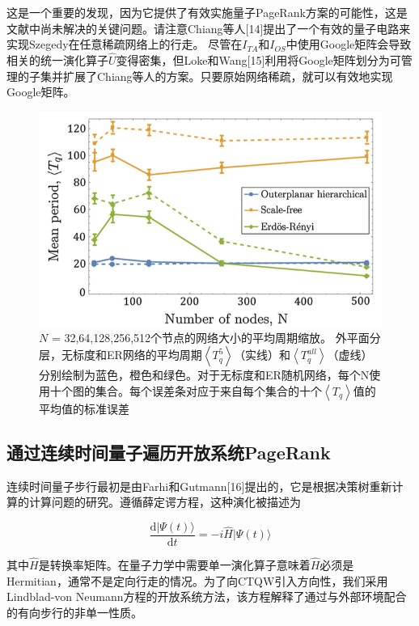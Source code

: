 这是一个重要的发现，因为它提供了有效实施量子PageRank方案的可能性，这是文献中尚未解决的关键问题。请注意Chiang等人[14]提出了一个有效的量子电路来实现Szegedy在任意稀疏网络上的行走。 尽管在$I_{TA}$和$I_{OS}$中使用Google矩阵会导致相关的统一演化算子$\hat{U}$变得密集，但Loke和Wang[15]利用将Google矩阵划分为可管理的子集并扩展了Chiang等人的方案。只要原始网络稀疏，就可以有效地实现Google矩阵。

\begin{figure}[h]
	\centering
	\includegraphics{part/pic/fig1.png}
	\caption{$N$ = 32,64,128,256,512个节点的网络大小的平均周期缩放。 外平面分层，无标度和ER网络的平均周期$\left\langle T _ { q } ^ { 5 } \right\rangle$（实线）和$\left\langle T _ { q } ^ { all } \right\rangle$（虚线）分别绘制为蓝色，橙色和绿色。对于无标度和ER随机网络，每个N使用十个图的集合。每个误差条对应于来自每个集合的十个$\left\langle T _ { q } \right\rangle$值的平均值的标准误差}
\end{figure}

\subsection{通过连续时间量子遍历开放系统PageRank}

连续时间量子步行最初是由Farhi和Gutmann[16]提出的，它是根据决策树重新计算的计算问题的研究。遵循薛定谔方程，这种演化被描述为

\begin{equation}
	\frac { \mathrm { d } | \Psi ( t ) \rangle } { \mathrm { d } t } = - i \hat { H } | \Psi ( t ) \rangle
\end{equation}

其中$\hat{H}$是转换率矩阵。在量子力学中需要单一演化算子意味着$\hat{H}$必须是Hermitian，通常不是定向行走的情况。为了向CTQW引入方向性，我们采用Lindblad-von Neumann方程的开放系统方法，该方程解释了通过与外部环境配合的有向步行的非单一性质。

